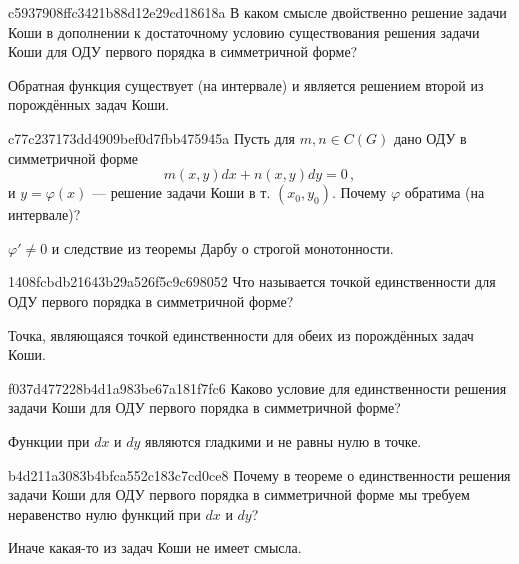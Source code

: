 \begin{note}{c5937908ffc3421b88d12e29cd18618a}
    В каком смысле двойственно решение задачи Коши в дополнении к достаточному условию существования решения задачи Коши для ОДУ первого порядка в симметричной форме?

    \begin{cloze}{1}
        Обратная функция существует (на интервале) и является решением второй из порождённых задач Коши.
    \end{cloze}
\end{note}

\begin{note}{c77c237173dd4909bef0d7fbb475945a}
    Пусть для \({ m, n \in C(G) }\) дано ОДУ в симметричной форме
    \[
        m(x, y) dx + n(x, y) dy = 0\,,
    \]
    и \({ y = \varphi(x) }\) --- решение задачи Коши в т. \({ (x_0, y_0) }\).
    Почему \({ \varphi }\) обратима (на интервале)?

    \begin{cloze}{1}
        \({ \varphi' \neq 0  }\) и следствие из теоремы Дарбу о строгой монотонности.
    \end{cloze}
\end{note}

\begin{note}{1408fcbdb21643b29a526f5c9c698052}
    Что называется точкой единственности для ОДУ первого порядка в симметричной форме?

    \begin{cloze}{1}
        Точка, являющаяся точкой единственности для обеих из порождённых задач Коши.
    \end{cloze}
\end{note}

\begin{note}{f037d477228b4d1a983be67a181f7fc6}
    Каково условие для единственности решения задачи Коши для ОДУ первого порядка в симметричной форме?

    \begin{cloze}{1}
        Функции при \({ dx }\) и \({ dy }\) являются гладкими и не равны нулю в точке.
    \end{cloze}
\end{note}

\begin{note}{b4d211a3083b4bfca552c183c7cd0ce8}
    Почему в теореме о единственности решения задачи Коши для ОДУ первого порядка в симметричной форме мы требуем неравенство нулю функций при \({ dx }\) и \({ dy }\)?

    \begin{cloze}{1}
        Иначе какая-то из задач Коши не имеет смысла.
    \end{cloze}
\end{note}

